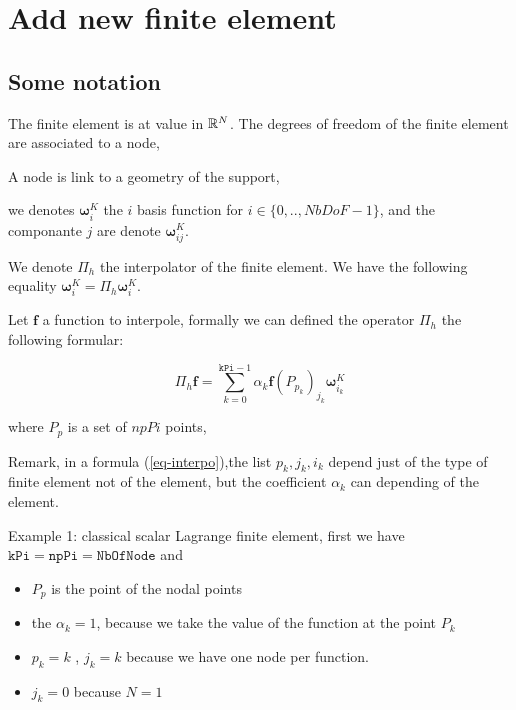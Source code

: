 \section{Add new finite element}

\subsection{Some notation}
\def\Fb#1{\boldsymbol{\omega}^{K}_{#1}}
\def\fbi{\mathbf{\omega}^{K}_{ij}}

The finite element is at value in $\mathbb{R}^{N}$.
The degrees of freedom of the finite element are associated to a node,

A node is link to a geometry of the support,





 

we denotes $\Fb{i}$ the $i$ basis function
  for  $i\in \{0,..,NbDoF-1\}$, and
  the componante $j$  are denote $\fbi$.
  
We denote $\Pi_{h}$ the interpolator of the finite element.
We have the following equality $\Fb{i} =  \Pi_{h} \Fb{i} $.

Let $\boldsymbol{f}$ a function to interpole,
formally we can defined the operator $\Pi_{h}$ 
the following formular:
  
\begin{equation}
\Pi_{h} \boldsymbol{f} = \sum_{k=0}^{\mathtt{kPi}-1} \alpha_k \boldsymbol{f}({P_{p_{k}}})_{j_{k}} \Fb{i_{k}} \label{eq-interpo}
\end{equation}
  
where $P_{p}$ is a set of $npPi$ points, 

Remark, in a formula (\ref{eq-interpo}),the list $ p_{k},j_{k},i_{k}$ depend just of  the type of finite element not of the element, but the coefficient  $\alpha_{k}$ can depending of the 
element. 

\medskip
 Example 1: classical scalar  Lagrange finite element, first we have $\mathtt{kPi}=\mathtt{npPi}=\mathtt{NbOfNode}$ and
\begin{itemize}
\item $P_{p}$ is the point of the nodal points
\item  the $\alpha_k=1$, because we take the value  of the function at the point $P_{k}$
\item $p_{k}=k$ ,  $j_{k}=k$ because we have one node per  function.
\item $j_{k}=0$ because $N=1$
\end{itemize}
  
